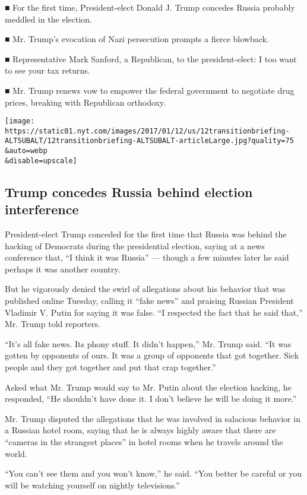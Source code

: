 ■ For the first time, President-elect Donald J. Trump concedes Russia
probably meddled in the election.

■ Mr. Trump's evocation of Nazi persecution prompts a fierce blowback.

■ Representative Mark Sanford, a Republican, to the president-elect: I
too want to see your tax returns.

■ Mr. Trump renews vow to empower the federal government to negotiate
drug prices, breaking with Republican orthodoxy.

\texttt{[image: https://static01.nyt.com/images/2017/01/12/us/12transitionbriefing-ALTSUBALT/12transitionbriefing-ALTSUBALT-articleLarge.jpg?quality=75\\\&auto=webp\\\&disable=upscale]}

\hypertarget{trump-concedes-russia-behind-election-interference}{%
\subsection{Trump concedes Russia behind election
interference}\label{trump-concedes-russia-behind-election-interference}}

President-elect Trump conceded for the first time that Russia was behind
the hacking of Democrats during the presidential election, saying at a
news conference that, ``I think it was Russia'' --- though a few minutes
later he said perhaps it was another country.

But he vigorously denied the swirl of allegations about his behavior
that was published online Tuesday, calling it ``fake news'' and praising
Russian President Vladimir V. Putin for saying it was false. ``I
respected the fact that he said that,'' Mr. Trump told reporters.

``It's all fake news. Its phony stuff. It didn't happen,'' Mr. Trump
said. ``It was gotten by opponents of ours. It was a group of opponents
that got together. Sick people and they got together and put that crap
together.''

Asked what Mr. Trump would say to Mr. Putin about the election hacking,
he responded, ``He shouldn't have done it. I don't believe he will be
doing it more.''

Mr. Trump disputed the allegations that he was involved in salacious
behavior in a Russian hotel room, saying that he is always highly aware
that there are ``cameras in the strangest places'' in hotel rooms when
he travels around the world.

``You can't see them and you won't know,'' he said. ``You better be
careful or you will be watching yourself on nightly televisions.''

